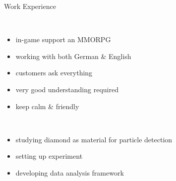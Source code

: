 \begin{frame}[t]{Work Experience}\centering\vspace*{5mm}
%
  \begin{minipage}[c][.8\textheight][t]{.45\textwidth}\centering
    \\[4ex]
    \vspace*{5ex}
    \begin{itemize}\itemspace{2ex}
      \item in-game support an MMORPG
      \item working with both German \& English
      \item customers ask everything
      \item very good understanding required
      \item keep calm \& friendly
    \end{itemize}
  \end{minipage}
%
  \begin{minipage}[c][.8\textheight][t]{.45\textwidth}\centering
    \\[2ex]
    \vspace*{4ex}
    \begin{itemize}\itemspace{2ex}
      \item studying diamond as material for particle detection
      \item setting up experiment
      \item developing data analysis framework
    \end{itemize}
  \end{minipage}
%
\end{frame}

